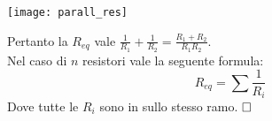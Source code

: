 \hfill%
\begin{minipage}{0.6\textwidth}\raggedleft
	\texttt{[image: parall\_res]}
\end{minipage}
Pertanto la $R_{eq}$ vale $\frac{1}{R_1} + \frac{1}{R_2} = \frac{R_1 + R_2}{R_1 R_2}$.\\
Nel caso di $n$ resistori vale la seguente formula:
\begin{equation}
    R_{eq} = \sum{\frac{1}{R_i}}
\end{equation}
Dove tutte le $R_i$ sono in  sullo stesso ramo.
$\hfill\square$
